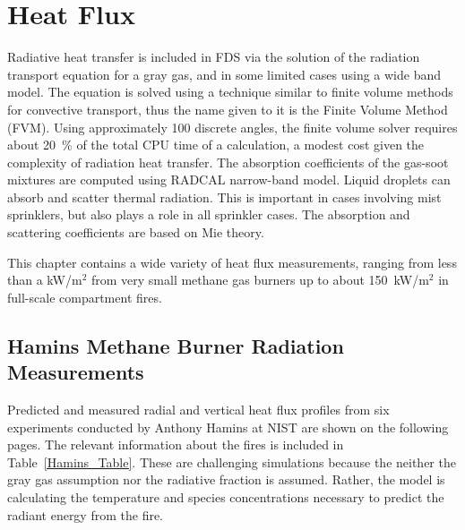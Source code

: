 \chapter{Heat Flux}

Radiative heat transfer is included in FDS via the solution of the radiation transport equation for a
gray gas, and in some limited cases using a wide band
model.  The equation is solved using a technique similar to finite
volume methods for convective transport, thus the name given to it is
the Finite Volume Method (FVM).  Using approximately 100 discrete
angles, the finite volume solver requires about 20~\% of the total CPU
time of a calculation, a modest cost given the complexity of radiation
heat transfer. The absorption coefficients of the gas-soot mixtures
are computed using RADCAL narrow-band model.  Liquid droplets can
absorb and scatter thermal radiation. This is important in cases
involving mist sprinklers, but also plays a role in all sprinkler
cases.  The absorption and scattering coefficients are based on Mie
theory.

This chapter contains a wide variety of heat flux measurements, ranging from less than a kW/m$^2$ from very small methane gas burners up to about 150~kW/m$^2$ in
full-scale compartment fires.




\section{Hamins Methane Burner Radiation Measurements}

Predicted and measured radial and vertical heat flux profiles from six experiments conducted by Anthony Hamins at NIST are shown on the following pages. The
relevant information about the fires is included in Table~\ref{Hamins_Table}. These are challenging simulations because the neither the gray gas assumption
nor the radiative fraction is assumed. Rather, the model is calculating the temperature and species concentrations necessary to predict the radiant energy from the fire.

